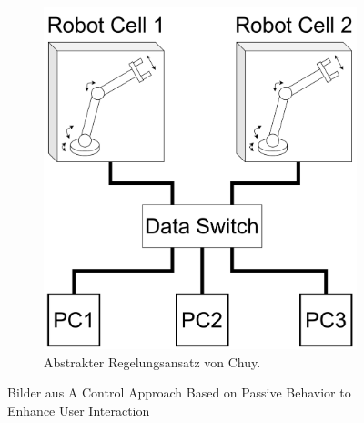 \begin{figure}[htbp]
\begin{subfigure}[b]{0.4\textwidth}
	   	\includegraphics[width=1\textwidth]{Figures/c6/network_setup.pdf}
	   	\caption{Abstrakter Regelungsansatz von Chuy.}
	   	\label{K2_chuy_control_P}
	   \end{subfigure}	
	\caption{Bilder aus \glqq A Control Approach Based on Passive Behavior
		to Enhance User Interaction \grqq{}\cite{chuy_07_approache}}
	\label{K2_chuy_robot_control_P}
\end{figure}

